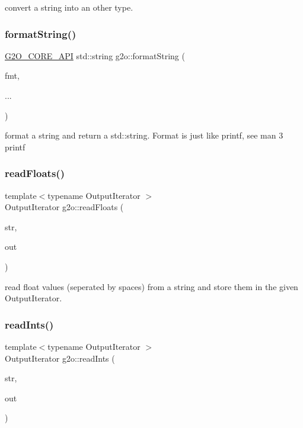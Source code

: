 convert a string into an other type. \mbox{\label{group__utils_gadc1d37473e0e8c6a73fb46b19239d2d1}} 
\subsubsection{\texorpdfstring{format\+String()}{formatString()}}
{\footnotesize\ttfamily \mbox{\hyperlink{g2o__core__api_8h_a7a8d7648d6f1e26632566f335751d064}{G2\+O\+\_\+\+C\+O\+R\+E\+\_\+\+A\+PI}} std\+::string g2o\+::format\+String (\begin{DoxyParamCaption}\item[{const char $\ast$}]{fmt,  }\item[{}]{... }\end{DoxyParamCaption})}

format a string and return a std\+::string. Format is just like printf, see man 3 printf \mbox{\label{group__utils_ga88353c6cfc2e519df07814ca577e71ec}} 
\subsubsection{\texorpdfstring{read\+Floats()}{readFloats()}}
{\footnotesize\ttfamily template$<$typename Output\+Iterator $>$ \\
Output\+Iterator g2o\+::read\+Floats (\begin{DoxyParamCaption}\item[{const char $\ast$}]{str,  }\item[{Output\+Iterator}]{out }\end{DoxyParamCaption})}

read float values (seperated by spaces) from a string and store them in the given Output\+Iterator. \mbox{\label{group__utils_gae501003a8f6b60afb846857fdb82174d}} 
\subsubsection{\texorpdfstring{read\+Ints()}{readInts()}}
{\footnotesize\ttfamily template$<$typename Output\+Iterator $>$ \\
Output\+Iterator g2o\+::read\+Ints (\begin{DoxyParamCaption}\item[{const char $\ast$}]{str,  }\item[{Output\+Iterator}]{out }\end{DoxyParamCaption})}

